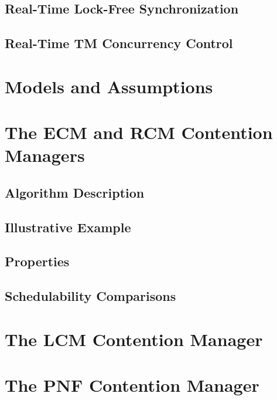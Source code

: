 \documentclass[12pt,english]{report}
\begin{document}
\section{Real-Time Lock-Free Synchronization}

\section{Real-Time TM Concurrency Control}


\chapter{\label{models_assmuptions}Models and Assumptions}


\chapter{\label{ecm-rcm} The ECM and RCM Contention Managers}

\section{Algorithm Description}

\section{Illustrative Example}

\section{Properties}

\section{Schedulability Comparisons}

\chapter{\label{ch_lcm} The LCM Contention Manager}



\chapter{\label{ch_pnf} The PNF Contention Manager}
\end{document}

